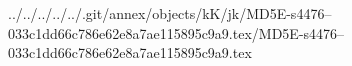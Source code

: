 ../../../../../.git/annex/objects/kK/jk/MD5E-s4476--033c1dd66c786e62e8a7ae115895c9a9.tex/MD5E-s4476--033c1dd66c786e62e8a7ae115895c9a9.tex